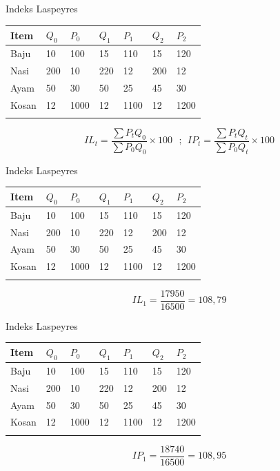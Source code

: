 \documentclass[
  ignorenonframetext,
]{beamer}
\begin{document}
\begin{frame}{Indeks Laspeyres}
\label{indeks-laspeyres}
\begin{longtable}[]{@{}lllllll@{}}
\toprule\noalign{}
Item & \(Q_0\) & \(P_0\) & \(Q_1\) & \(P_1\) & \(Q_2\) & \(P_2\) \\
\midrule\noalign{}
\endhead
Baju & 10 & 100 & 15 & 110 & 15 & 120 \\
Nasi & 200 & 10 & 220 & 12 & 200 & 12 \\
Ayam & 50 & 30 & 50 & 25 & 45 & 30 \\
Kosan & 12 & 1000 & 12 & 1100 & 12 & 1200 \\
\bottomrule\noalign{}
\end{longtable}

\[
IL_t=\frac{\sum P_t Q_0}{\sum P_0 Q_0} \times 100 \ \ \ ; \ \ IP_t=\frac{\sum P_t Q_t}{\sum P_0 Q_t} \times 100
\]
\end{frame}

\begin{frame}{Indeks Laspeyres}
\label{indeks-laspeyres-1}
\begin{longtable}[]{@{}lllllll@{}}
\toprule\noalign{}
Item & \(Q_0\) & \(P_0\) & \(Q_1\) & \(P_1\) & \(Q_2\) & \(P_2\) \\
\midrule\noalign{}
\endhead
Baju & 10 & 100 & 15 & 110 & 15 & 120 \\
Nasi & 200 & 10 & 220 & 12 & 200 & 12 \\
Ayam & 50 & 30 & 50 & 25 & 45 & 30 \\
Kosan & 12 & 1000 & 12 & 1100 & 12 & 1200 \\
\bottomrule\noalign{}
\end{longtable}

\[
IL_1=\frac{17950}{16500}=108,79
\]
\end{frame}

\begin{frame}{Indeks Laspeyres}
\label{indeks-laspeyres-2}
\begin{longtable}[]{@{}lllllll@{}}
\toprule\noalign{}
Item & \(Q_0\) & \(P_0\) & \(Q_1\) & \(P_1\) & \(Q_2\) & \(P_2\) \\
\midrule\noalign{}
\endhead
Baju & 10 & 100 & 15 & 110 & 15 & 120 \\
Nasi & 200 & 10 & 220 & 12 & 200 & 12 \\
Ayam & 50 & 30 & 50 & 25 & 45 & 30 \\
Kosan & 12 & 1000 & 12 & 1100 & 12 & 1200 \\
\bottomrule\noalign{}
\end{longtable}

\[
IP_1=\frac{18740}{16500}=108,95
\]
\end{frame}
\end{document}

